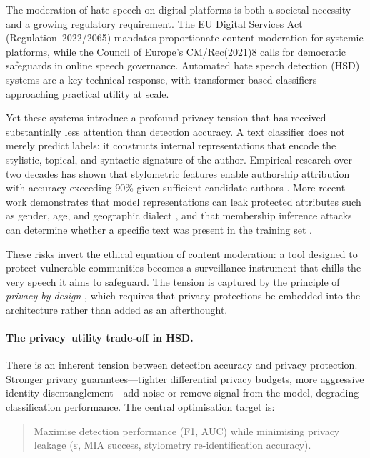 \documentclass{article}
\begin{document}
The moderation of hate speech on digital platforms is both a societal necessity
and a growing regulatory requirement. The EU Digital Services Act
(Regulation~2022/2065) mandates proportionate content moderation for systemic
platforms, while the Council of Europe's CM/Rec(2021)8 calls for democratic
safeguards in online speech governance.
Automated hate speech detection (HSD) systems are a key technical response,
with transformer-based classifiers approaching practical utility at scale.

Yet these systems introduce a profound privacy tension that has received
substantially less attention than detection accuracy.
A text classifier does not merely predict labels: it constructs internal
representations that encode the stylistic, topical, and syntactic
signature of the author.
Empirical research over two decades has shown that stylometric features
enable authorship attribution with accuracy exceeding 90\% given
sufficient candidate authors \cite{abbasi2008writerpints,narayanan2012feasibility}.
More recent work demonstrates that model representations can leak protected
attributes such as gender, age, and geographic dialect
\cite{shokri2017membership,fredrikson2015model}, and that membership
inference attacks can determine whether a specific text was present in
the training set \cite{makroo2025hidden,yeom2018privacy}.

These risks invert the ethical equation of content moderation: a tool
designed to protect vulnerable communities becomes a surveillance instrument
that chills the very speech it aims to safeguard.
The tension is captured by the principle of \emph{privacy by design}
\cite{cavoukian2009privacy}, which requires that privacy protections be
embedded into the architecture rather than added as an afterthought.

\paragraph{The privacy--utility trade-off in HSD.}
There is an inherent tension between detection accuracy and privacy
protection. Stronger privacy guarantees---tighter differential privacy
budgets, more aggressive identity disentanglement---add noise or remove
signal from the model, degrading classification performance.
The central optimisation target is:

\begin{quote}
Maximise detection performance (F1, AUC) while minimising privacy leakage
($\varepsilon$, MIA success, stylometry re-identification accuracy).
\end{quote}
\end{document}
